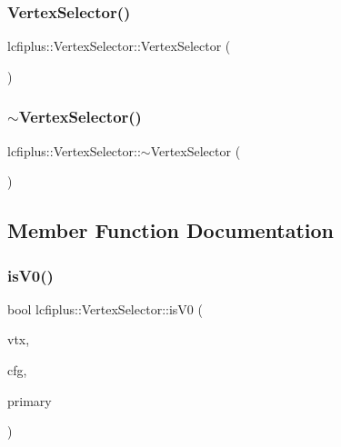 \subsubsection{Vertex\+Selector()}
{\footnotesize\ttfamily lcfiplus\+::\+Vertex\+Selector\+::\+Vertex\+Selector (\begin{DoxyParamCaption}{ }\end{DoxyParamCaption})\hspace{0.3cm}{\ttfamily [inline]}}

\mbox{\label{classlcfiplus_1_1VertexSelector_a270b98eea3a1859153e9f9d99c78e571}} 
\subsubsection{$\sim$\+Vertex\+Selector()}
{\footnotesize\ttfamily lcfiplus\+::\+Vertex\+Selector\+::$\sim$\+Vertex\+Selector (\begin{DoxyParamCaption}{ }\end{DoxyParamCaption})\hspace{0.3cm}{\ttfamily [inline]}}



\subsection{Member Function Documentation}
\mbox{\label{classlcfiplus_1_1VertexSelector_a61969ef2915ff86e750fa104cb19a0a8}} 
\subsubsection{is\+V0()}
{\footnotesize\ttfamily bool lcfiplus\+::\+Vertex\+Selector\+::is\+V0 (\begin{DoxyParamCaption}\item[{const \textbf{ Vertex} $\ast$}]{vtx,  }\item[{const \textbf{ Vertex\+Selector\+Config} \&}]{cfg,  }\item[{const \textbf{ Vertex} $\ast$}]{primary }\end{DoxyParamCaption})\hspace{0.3cm}{\ttfamily [inline]}}



